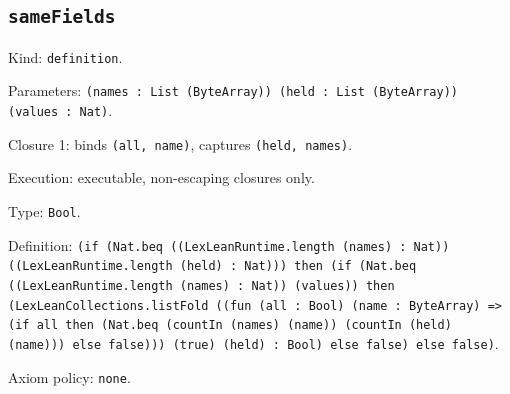 \documentclass[11pt]{article}
\begin{document}
\subsection*{\texttt{sameFields}}
\noindent Kind: \texttt{definition}.\par
\noindent Parameters: \texttt{(names : List (ByteArray)) (held : List (ByteArray)) (values : Nat)}.\par
\noindent Closure 1: binds \texttt{(all, name)}, captures \texttt{(held, names)}.\par
\noindent Execution: executable, non-escaping closures only.\par
\noindent Type: \texttt{Bool}.\par
\noindent Definition: \texttt{(if (Nat.beq ((LexLeanRuntime.length (names) : Nat)) ((LexLeanRuntime.length (held) : Nat))) then (if (Nat.beq ((LexLeanRuntime.length (names) : Nat)) (values)) then (LexLeanCollections.listFold ((fun (all : Bool) (name : ByteArray) => (if all then (Nat.beq (countIn (names) (name)) (countIn (held) (name))) else false))) (true) (held) : Bool) else false) else false)}.\par
\noindent Axiom policy: \texttt{none}.\par
\end{document}
